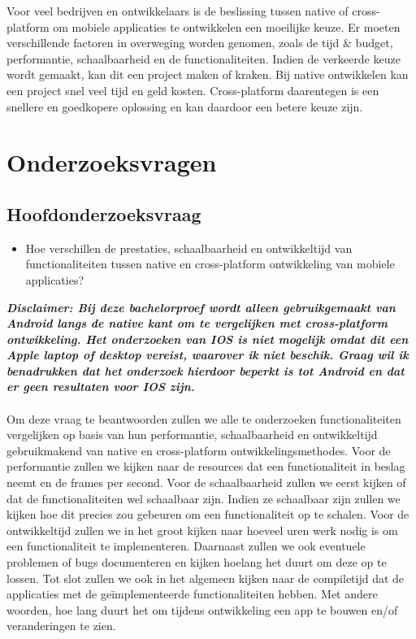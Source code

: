 Voor veel bedrijven en ontwikkelaars is de beslissing tussen native of cross-platform om mobiele applicaties te ontwikkelen een moeilijke keuze. 
Er moeten verschillende factoren in overweging worden genomen, zoals de tijd \& budget, performantie, schaalbaarheid en de functionaliteiten. 
Indien de verkeerde keuze wordt gemaakt, kan dit een project maken of kraken. Bij native ontwikkelen kan een project snel veel tijd en geld kosten. 
Cross-platform daarentegen is een snellere en goedkopere oplossing en kan daardoor een betere keuze zijn.

\section{Onderzoeksvragen}%
\label{sec:onderzoeksvraag}

\subsection{Hoofdonderzoeksvraag}
\begin{itemize}
    \item Hoe verschillen de prestaties, schaalbaarheid en ontwikkeltijd van functionaliteiten tussen native en cross-platform ontwikkeling van mobiele applicaties?
\end{itemize}

\label{disclaimer:ios}
\textbf{\textit{Disclaimer: Bij deze bachelorproef wordt alleen gebruikgemaakt van Android langs de native kant om te vergelijken met cross-platform ontwikkeling. 
Het onderzoeken van IOS is niet mogelijk omdat dit een Apple laptop of desktop vereist, waarover ik niet beschik. 
Graag wil ik benadrukken dat het onderzoek hierdoor beperkt is tot Android en dat er geen resultaten voor IOS zijn.}}
\\\\
Om deze vraag te beantwoorden zullen we alle te onderzoeken functionaliteiten vergelijken op basis van hun performantie, 
schaalbaarheid en ontwikkeltijd gebruikmakend van native en cross-platform ontwikkelingsmethodes. 
Voor de performantie zullen we kijken naar de resources dat een functionaliteit in beslag neemt en de frames per second. 
Voor de schaalbaarheid zullen we eerst kijken of dat de functionaliteiten wel schaalbaar zijn. 
Indien ze schaalbaar zijn zullen we kijken hoe dit precies zou gebeuren om een functionaliteit op te schalen. 
Voor de ontwikkeltijd zullen we in het groot kijken naar hoeveel uren werk nodig is om een functionaliteit te implementeren. 
Daarnaast zullen we ook eventuele problemen of bugs documenteren en kijken hoelang het duurt om deze op te lossen. 
Tot slot zullen we ook in het algemeen kijken naar de compiletijd dat de applicaties met de geïmplementeerde functionaliteiten hebben. 
Met andere woorden, hoe lang duurt het om tijdens ontwikkeling een app te bouwen en/of veranderingen te zien.

